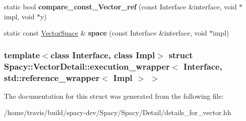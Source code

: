 \begin{DoxyCompactItemize}
\item 
\hypertarget{structSpacy_1_1VectorDetail_1_1execution__wrapper_3_01Interface_00_01std_1_1reference__wrapper_3_01Impl_01_4_01_4_a7a4e98dbfcd41d0f9dc84b8b510bea8d}{static bool {\bfseries compare\-\_\-const\-\_\-\-Vector\-\_\-ref} (const \-Interface \&interface, void $\ast$impl, void $\ast$y)}\label{structSpacy_1_1VectorDetail_1_1execution__wrapper_3_01Interface_00_01std_1_1reference__wrapper_3_01Impl_01_4_01_4_a7a4e98dbfcd41d0f9dc84b8b510bea8d}

\item 
\hypertarget{structSpacy_1_1VectorDetail_1_1execution__wrapper_3_01Interface_00_01std_1_1reference__wrapper_3_01Impl_01_4_01_4_ae24057ea85d020d9ad2cc3da60aa87a7}{static const \hyperlink{classSpacy_1_1VectorSpace}{\-Vector\-Space} \& {\bfseries space} (const \-Interface \&interface, void $\ast$impl)}\label{structSpacy_1_1VectorDetail_1_1execution__wrapper_3_01Interface_00_01std_1_1reference__wrapper_3_01Impl_01_4_01_4_ae24057ea85d020d9ad2cc3da60aa87a7}

\end{DoxyCompactItemize}
\subsubsection*{template$<$class Interface, class Impl$>$ struct Spacy\-::\-Vector\-Detail\-::execution\-\_\-wrapper$<$ Interface, std\-::reference\-\_\-wrapper$<$ Impl $>$ $>$}



\-The documentation for this struct was generated from the following file\-:\begin{DoxyCompactItemize}
\item 
/home/travis/build/spacy-\/dev/\-Spacy/\-Spacy/\-Detail/details\-\_\-for\-\_\-vector.\-hh\end{DoxyCompactItemize}
